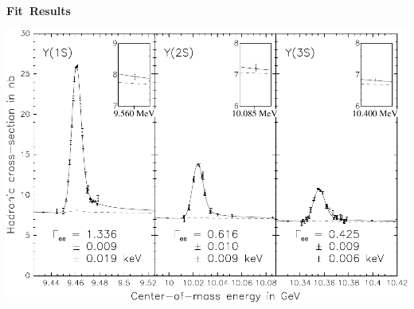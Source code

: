 \documentclass[landscape]{article}
\newenvironment{slide}[1][ ]{\mbox{\bf #1 } \vfill}{\vfill \mbox{ } \pagebreak}
\begin{document}
\begin{slide}[Fit Results]

\vspace{0.5 cm}
\begin{center}
  \includegraphics[width=\linewidth]{xfiged_three_resonances_inset_squat2}
\end{center}
\vspace{-1 cm}

\end{slide}
\end{document}

